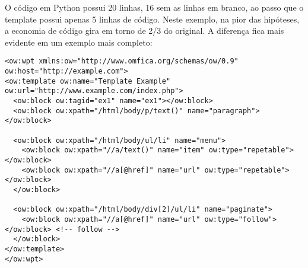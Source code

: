 O código em Python possui 20 linhas, 16 sem as linhas em branco, ao passo que o template possui apenas 5 linhas de código. Neste exemplo, na pior das hipóteses, a economia de código gira em torno de 2/3 do original. A diferença fica mais evidente em um exemplo mais completo:

\begin{lstlisting}
<ow:wpt xmlns:ow="http://www.omfica.org/schemas/ow/0.9"
ow:host="http://example.com">
<ow:template ow:name="Template Example" ow:url="http://www.example.com/index.php">
  <ow:block ow:tagid="ex1" name="ex1"></ow:block>
  <ow:block ow:xpath="/html/body/p/text()" name="paragraph"></ow:block>
  
  <ow:block ow:xpath="/html/body/ul/li" name="menu">
    <ow:block ow:xpath="//a/text()" name="item" ow:type="repetable"></ow:block>
    <ow:block ow:xpath="//a[@href]" name="url" ow:type="repetable"></ow:block>
  </ow:block>
  
  <ow:block ow:xpath="/html/body/div[2]/ul/li" name="paginate">
    <ow:block ow:xpath="//a[@href]" name="url" ow:type="follow"></ow:block> <!-- follow -->
  </ow:block>
</ow:template> 
</ow:wpt>
\end{lstlisting}

